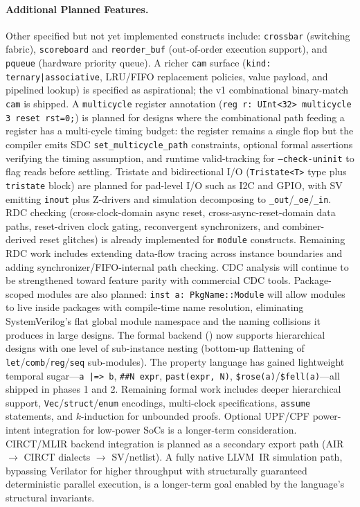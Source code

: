 \documentclass[11pt,twocolumn]{article}
\begin{document}
\paragraph{Additional Planned Features.}
Other specified but not yet implemented constructs include:
\texttt{crossbar} (switching fabric),
\texttt{scoreboard} and \texttt{reorder\_buf} (out-of-order execution support),
and \texttt{pqueue} (hardware priority queue).
A richer \texttt{cam} surface (\texttt{kind: ternary|associative}, LRU/FIFO replacement policies, value payload, and pipelined lookup) is specified as aspirational; the v1 combinational binary-match \texttt{cam} is shipped.
A \texttt{multicycle} register annotation (\texttt{reg r: UInt<32> multicycle 3 reset rst=0;}) is planned for designs where the combinational path feeding a register has a multi-cycle timing budget: the register remains a single flop but the compiler emits SDC \texttt{set\_multicycle\_path} constraints, optional formal assertions verifying the timing assumption, and runtime valid-tracking for \texttt{--check-uninit} to flag reads before settling.
Tristate and bidirectional I/O (\texttt{Tristate<T>} type plus \texttt{tristate} block) are planned for pad-level I/O such as I2C and GPIO, with SV emitting \texttt{inout} plus Z-drivers and simulation decomposing to \texttt{\_out}/\texttt{\_oe}/\texttt{\_in}.
RDC checking (cross-clock-domain async reset, cross-async-reset-domain data paths, reset-driven clock gating, reconvergent synchronizers, and combiner-derived reset glitches) is already implemented for \texttt{module} constructs. Remaining RDC work includes extending data-flow tracing across instance boundaries and adding synchronizer/FIFO-internal path checking. CDC analysis will continue to be strengthened toward feature parity with commercial CDC tools.
Package-scoped modules are also planned: \texttt{inst a: PkgName::Module} will allow modules to live inside packages with compile-time name resolution, eliminating SystemVerilog's flat global module namespace and the naming collisions it produces in large designs.
The formal backend () now supports hierarchical designs with one level of sub-instance nesting (bottom-up flattening of \texttt{let}/\texttt{comb}/\texttt{reg}/\texttt{seq} sub-modules). The property language has gained lightweight temporal sugar---\texttt{a |=> b}, \texttt{\#\#N expr}, \texttt{past(expr, N)}, \texttt{\$rose(a)}/\texttt{\$fell(a)}---all shipped in phases 1 and 2. Remaining formal work includes deeper hierarchical support, \texttt{Vec}/\texttt{struct}/\texttt{enum} encodings, multi-clock specifications, \texttt{assume} statements, and $k$-induction for unbounded proofs.
Optional UPF/CPF power-intent integration for low-power SoCs is a longer-term consideration.
CIRCT/MLIR backend integration is planned as a secondary export path (AIR $\to$ CIRCT dialects $\to$ SV/netlist).
A fully native LLVM~IR simulation path, bypassing Verilator for higher throughput with structurally guaranteed deterministic parallel execution, is a longer-term goal enabled by the language's structural invariants.
\end{document}
